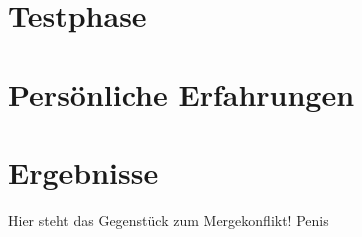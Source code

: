 \chapter{Testphase}
\renewcommand{\kapitelautor}{}

\chapter{Persönliche Erfahrungen}

\chapter{Ergebnisse}

Hier steht das Gegenstück zum Mergekonflikt! Penis
